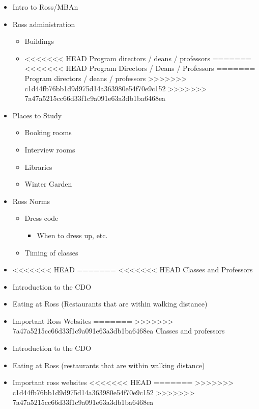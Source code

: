 \documentclass[
]{book}
\providecommand{\tightlist}{%
  \setlength{\itemsep}{0pt}\setlength{\parskip}{0pt}}
\begin{document}
\begin{itemize}
\tightlist
\item
  Intro to Ross/MBAn
\item
  Ross administration

  \begin{itemize}
  \tightlist
  \item
    Buildings
  \item
<<<<<<< HEAD
    Program directors / deans / professors
=======
<<<<<<< HEAD
    Program Directors / Deans / Professors
=======
    Program directors / deans / professors
>>>>>>> c1d44fb76bb1d9d975d14a363980e54f70e9c152
>>>>>>> 7a47a5215cc66d33f1c9a091e63a3db1ba6468ea
  \end{itemize}
\item
  Places to Study

  \begin{itemize}
  \tightlist
  \item
    Booking rooms
  \item
    Interview rooms
  \item
    Libraries
  \item
    Winter Garden
  \end{itemize}
\item
  Ross Norms

  \begin{itemize}
  \tightlist
  \item
    Dress code

    \begin{itemize}
    \tightlist
    \item
      When to dress up, etc.
    \end{itemize}
  \item
    Timing of classes
  \end{itemize}
\item
<<<<<<< HEAD
=======
<<<<<<< HEAD
  Classes and Professors
\item
  Introduction to the CDO
\item
  Eating at Ross (Restaurants that are within walking distance)
\item
  Important Ross Websites
=======
>>>>>>> 7a47a5215cc66d33f1c9a091e63a3db1ba6468ea
  Classes and professors
\item
  Introduction to the CDO
\item
  Eating at Ross (restaurants that are within walking distance)
\item
  Important ross websites
<<<<<<< HEAD
=======
>>>>>>> c1d44fb76bb1d9d975d14a363980e54f70e9c152
>>>>>>> 7a47a5215cc66d33f1c9a091e63a3db1ba6468ea


\end{itemize}
\end{document}
